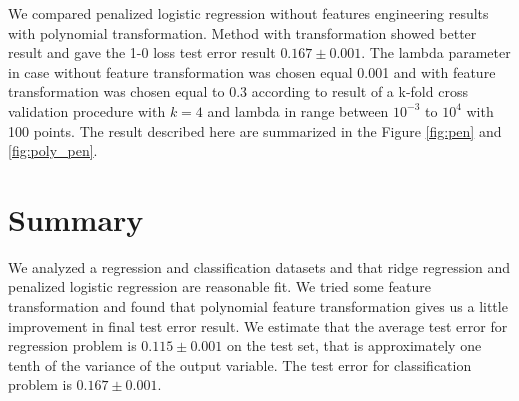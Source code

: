 \documentclass{article} %
\begin{document}
We compared penalized logistic regression without features engineering results with polynomial transformation. Method with transformation showed better result and gave the 1-0 loss test error result  $0.167\pm0.001$. The lambda parameter in case without feature transformation was chosen equal 0.001 and with feature transformation was chosen equal to 0.3 according to result of a k-fold cross validation procedure with $k=4$ and lambda in range between $10^{-3}$ to $10^4$  with 100 points. The result described here are summarized in the Figure \ref{fig:pen} and \ref{fig:poly_pen}.

\begin{figure}[!t]
\center
{}
\hfill
\caption{}
\end{figure}

\section{Summary}
We analyzed a regression and classification datasets and that ridge regression and penalized logistic regression are reasonable fit.
We tried some feature transformation and found that polynomial feature transformation gives us a little improvement in final test error result. 
We estimate that the average test error for regression problem is $0.115\pm0.001$ on the test set, that is approximately one tenth of the variance of the output variable. The test error for classification problem is $0.167\pm0.001$.
\end{document}
